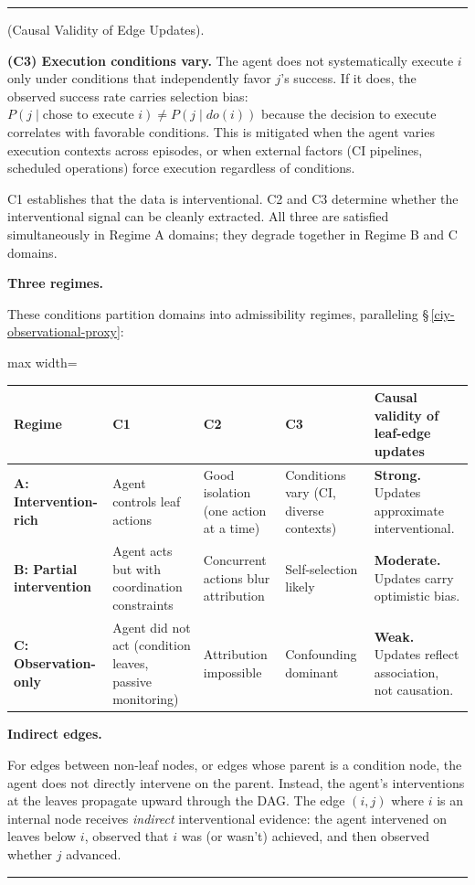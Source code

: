 \documentclass[11pt,oneside]{article}
\newcounter{claim}[section]
\renewcommand{\theclaim}{\thesection.\arabic{claim}}
\newenvironment{segment}[2]{%
  \refstepcounter{claim}%
  \bigskip\noindent\hrule\smallskip
  \noindent{\bfseries #1~\theclaim}\enskip(#2).\par\smallskip
  \noindent\ignorespaces
}{%
  \par\smallskip\noindent\hrule\bigskip
}
\newenvironment{scope}[1][]{\begin{segment}{Scope}{#1}}{\end{segment}}
\begin{document}
\begin{scope}[Causal Validity of Edge Updates]
\textbf{(C3) Execution conditions vary.} The agent does not systematically execute $i$ only under conditions that independently favor $j$'s success. If it does, the observed success rate carries selection bias: $P(j \mid \text{chose to execute } i) \neq P(j \mid do(i))$ because the decision to execute correlates with favorable conditions. This is mitigated when the agent varies execution contexts across episodes, or when external factors (CI pipelines, scheduled operations) force execution regardless of conditions.

C1 establishes that the data is interventional. C2 and C3 determine whether the interventional signal can be cleanly extracted. All three are satisfied simultaneously in Regime A domains; they degrade together in Regime B and C domains.


\medskip\noindent\textbf{Three regimes.}


These conditions partition domains into admissibility regimes, paralleling \S\,\ref{ciy-observational-proxy}:

\begin{adjustbox}{max width=\textwidth}
\small
\begin{tabular}{lllll}
\toprule
Regime & C1 & C2 & C3 & Causal validity of leaf-edge updates \\
\midrule
\textbf{A: Intervention-rich} & Agent controls leaf actions & Good isolation (one action at a time) & Conditions vary (CI, diverse contexts) & \textbf{Strong.} Updates approximate interventional. \\
\textbf{B: Partial intervention} & Agent acts but with coordination constraints & Concurrent actions blur attribution & Self-selection likely & \textbf{Moderate.} Updates carry optimistic bias. \\
\textbf{C: Observation-only} & Agent did not act (condition leaves, passive monitoring) & Attribution impossible & Confounding dominant & \textbf{Weak.} Updates reflect association, not causation. \\
\bottomrule
\end{tabular}
\end{adjustbox}



\medskip\noindent\textbf{Indirect edges.}


For edges between non-leaf nodes, or edges whose parent is a condition node, the agent does not directly intervene on the parent. Instead, the agent's interventions at the leaves propagate upward through the DAG. The edge $(i, j)$ where $i$ is an internal node receives \textit{indirect} interventional evidence: the agent intervened on leaves below $i$, observed that $i$ was (or wasn't) achieved, and then observed whether $j$ advanced.


\end{scope}
\end{document}

